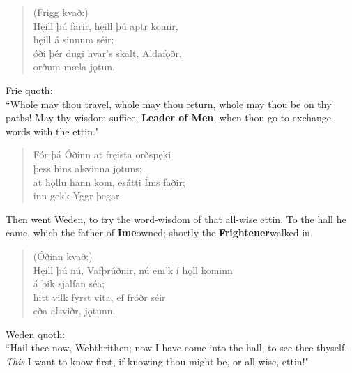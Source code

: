 \begin{verse}
(Frigg kvað:) \\%
\bva Hęill þú farir, \hld hęill þú aptr komir, \\%
\ind hęill á sinnum séir; \\%
ǿði þér dugi \hld hvar's skalt, Aldafǫðr, \\%
\ind orðum mæla jǫtun.\\%
\end{verse}

\bvb Frie quoth: \\ “Whole may thou travel, whole may thou return, whole may thou be on thy paths! May thy wisdom suffice, \textbf{Leader of Men}, when thou go to exchange words with the ettin." \\

\begin{verse}
\bva Fór þá Óðinn \hld at fręista orðspęki \\%
\ind þess hins alsvinna jǫtuns; \\%
at hǫllu hann kom, \hld es\footnotemark[1] átti Íms faðir; \\%
\ind inn gekk Yggr þegar.\\%
\end{verse}

\bvb Then went Weden, to try the word-wisdom of that all-wise ettin. To the hall he came, which the father of \textbf{Ime}\footnotemark[5] owned; shortly the \textbf{Frightener}\footnotemark[6] walked in. \\

\begin{verse}
(Óðinn kvað:) \\%
\bva Hęill þú nú, Vafþrúðnir, \hld nú em'k í hǫll kominn \\%
\ind á þik sjalfan séa; \\%
hitt vilk fyrst vita, \hld ef fróðr séir \\%
\ind eða alsviðr, jǫtunn.\\%
\end{verse}

\bvb Weden quoth: \\ “Hail thee now, Webthrithen; now I have come into the hall, to see thee thyself. \emph{This} I want to know first, if knowing thou might be, or all-wise, ettin!" \\

